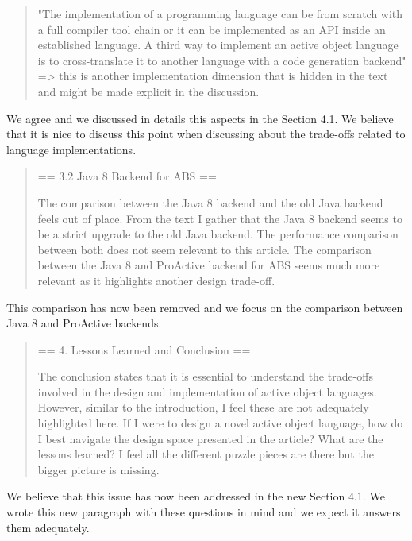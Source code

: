 \documentclass{article}
\begin{document}

\begin{quote}
 "The implementation of a programming language can be from scratch with a full compiler 
tool chain or it can be implemented as an API inside an established language. A third way 
to implement an active object language is to cross-translate it to another language with 
a code generation backend" => this is another implementation dimension that is hidden in 
the text and might be made explicit in the discussion.
\end{quote}
We agree and we discussed in details this aspects in the Section 4.1. We believe that it 
is nice to discuss this point when discussing about the trade-offs related to language 
implementations.


\begin{quote}
	== 3.2 Java 8 Backend for ABS ==

The comparison between the Java 8 backend and the old Java backend feels out of place. 
From the text I gather that the Java 8 backend seems to be a strict upgrade to the old 
Java backend. The performance comparison between both does not seem relevant to this 
article.
The comparison between the Java 8 and ProActive backend for ABS seems much more relevant 
as it highlights another design trade-off.
\end{quote}
This comparison has now been removed and we focus on the comparison between Java 8 and 
ProActive backends.

\begin{quote}
	== 4. Lessons Learned and Conclusion ==

The conclusion states that it is essential to understand the trade-offs involved in the 
design and implementation of active object languages. However, similar to the 
introduction, I feel these are not adequately highlighted here. If I were to design a 
novel active object language, how do I best navigate the design space presented in the 
article? What are the lessons learned? I feel all the different puzzle pieces are there 
but the bigger picture is missing.
\end{quote}
We believe that this issue has now been addressed in the new Section 4.1. We wrote this 
new paragraph with these questions in mind and we expect it answers them adequately.
\end{document}
